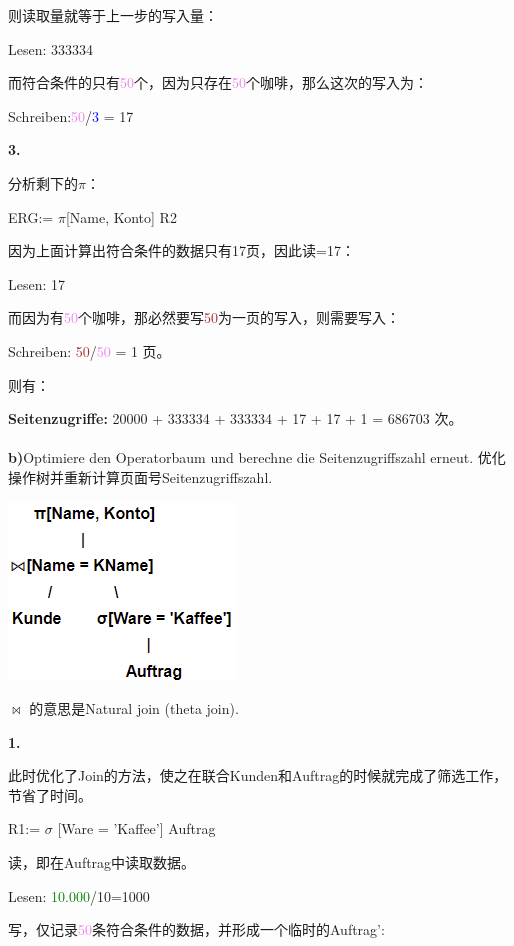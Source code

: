 \documentclass[fleqn]{article}
\begin{document}
则读取量就等于上一步的写入量：

Lesen: 333334

而符合条件的只有\textcolor{violet}{50}个，因为只存在\textcolor{violet}{50}个咖啡，那么这次的写入为：

Schreiben:\textcolor{violet}{50}/\textcolor{blue}{3} = 17

\textbf{3.}

分析剩下的$\pi$：

ERG:= $\pi$[Name, Konto] R2

因为上面计算出符合条件的数据只有17页，因此读=17：

Lesen: 17

而因为有\textcolor{violet}{50}个咖啡，那必然要写\textcolor{brown}{50}为一页的写入，则需要写入：

Schreiben: \textcolor{brown}{50}/\textcolor{violet}{50} = 1 页。

则有：

\textbf{Seitenzugriffe:} 20000 + 333334 + 333334 + 17 + 17 + 1 = 686703 次。
\\
\\
\textbf{b)}Optimiere den Operatorbaum und berechne die Seitenzugriffszahl erneut.
优化操作树并重新计算页面号Seitenzugriffszahl.

\begin{center}
    \includegraphics[scale=0.6]{40.png}
\end{center}

$\bowtie$ 的意思是Natural join (theta join).

\textbf{1.}

此时优化了Join的方法，使之在联合Kunden和Auftrag的时候就完成了筛选工作，节省了时间。

R1:= $\sigma$ [Ware = 'Kaffee'] Auftrag 

读，即在Auftrag中读取数据。

Lesen: \textcolor{green}{10.000}/\textcolor[RGB]{84,139,84}{10}=1000

写，仅记录\textcolor{violet}{50}条符合条件的数据，并形成一个临时的Auftrag':
\end{document}
